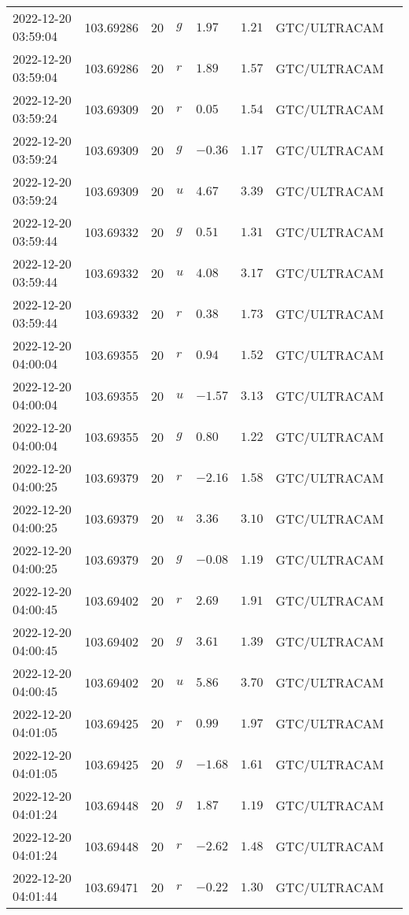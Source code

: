 \documentclass{nature_plusfigure}
\begin{document}
\begin{supplement}
\begin{center}
\begin{longtable}{llllllll}
2022-12-20 03:59:04 & 103.69286 & 20 & $g$ & $1.97$ & $1.21$ & GTC/ULTRACAM &  \\ 
2022-12-20 03:59:04 & 103.69286 & 20 & $r$ & $1.89$ & $1.57$ & GTC/ULTRACAM &  \\ 
2022-12-20 03:59:24 & 103.69309 & 20 & $r$ & $0.05$ & $1.54$ & GTC/ULTRACAM &  \\ 
2022-12-20 03:59:24 & 103.69309 & 20 & $g$ & $-0.36$ & $1.17$ & GTC/ULTRACAM &  \\ 
2022-12-20 03:59:24 & 103.69309 & 20 & $u$ & $4.67$ & $3.39$ & GTC/ULTRACAM &  \\ 
2022-12-20 03:59:44 & 103.69332 & 20 & $g$ & $0.51$ & $1.31$ & GTC/ULTRACAM &  \\ 
2022-12-20 03:59:44 & 103.69332 & 20 & $u$ & $4.08$ & $3.17$ & GTC/ULTRACAM &  \\ 
2022-12-20 03:59:44 & 103.69332 & 20 & $r$ & $0.38$ & $1.73$ & GTC/ULTRACAM &  \\ 
2022-12-20 04:00:04 & 103.69355 & 20 & $r$ & $0.94$ & $1.52$ & GTC/ULTRACAM &  \\ 
2022-12-20 04:00:04 & 103.69355 & 20 & $u$ & $-1.57$ & $3.13$ & GTC/ULTRACAM &  \\ 
2022-12-20 04:00:04 & 103.69355 & 20 & $g$ & $0.80$ & $1.22$ & GTC/ULTRACAM &  \\ 
2022-12-20 04:00:25 & 103.69379 & 20 & $r$ & $-2.16$ & $1.58$ & GTC/ULTRACAM &  \\ 
2022-12-20 04:00:25 & 103.69379 & 20 & $u$ & $3.36$ & $3.10$ & GTC/ULTRACAM &  \\ 
2022-12-20 04:00:25 & 103.69379 & 20 & $g$ & $-0.08$ & $1.19$ & GTC/ULTRACAM &  \\ 
2022-12-20 04:00:45 & 103.69402 & 20 & $r$ & $2.69$ & $1.91$ & GTC/ULTRACAM &  \\ 
2022-12-20 04:00:45 & 103.69402 & 20 & $g$ & $3.61$ & $1.39$ & GTC/ULTRACAM &  \\ 
2022-12-20 04:00:45 & 103.69402 & 20 & $u$ & $5.86$ & $3.70$ & GTC/ULTRACAM &  \\ 
2022-12-20 04:01:05 & 103.69425 & 20 & $r$ & $0.99$ & $1.97$ & GTC/ULTRACAM &  \\ 
2022-12-20 04:01:05 & 103.69425 & 20 & $g$ & $-1.68$ & $1.61$ & GTC/ULTRACAM &  \\ 
2022-12-20 04:01:24 & 103.69448 & 20 & $g$ & $1.87$ & $1.19$ & GTC/ULTRACAM &  \\ 
2022-12-20 04:01:24 & 103.69448 & 20 & $r$ & $-2.62$ & $1.48$ & GTC/ULTRACAM &  \\ 
2022-12-20 04:01:44 & 103.69471 & 20 & $r$ & $-0.22$ & $1.30$ & GTC/ULTRACAM &  \\ 

\end{longtable}
\end{center}
\end{supplement}
\end{document}
